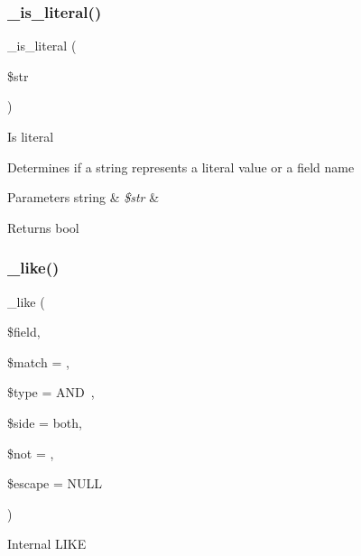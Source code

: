 \subsubsection{\texorpdfstring{\+\_\+is\+\_\+literal()}{\_is\_literal()}}
{\footnotesize\ttfamily \+\_\+is\+\_\+literal (\begin{DoxyParamCaption}\item[{}]{\$str }\end{DoxyParamCaption})\hspace{0.3cm}{\ttfamily [protected]}}

Is literal

Determines if a string represents a literal value or a field name


\begin{DoxyParams}[1]{Parameters}
string & {\em \$str} & \\
\hline
\end{DoxyParams}
\begin{DoxyReturn}{Returns}
bool 
\end{DoxyReturn}
\mbox{\label{class_c_i___d_b__query__builder_abe8f3477d4b15bf422fc52ba753056b5}} 
\subsubsection{\texorpdfstring{\+\_\+like()}{\_like()}}
{\footnotesize\ttfamily \+\_\+like (\begin{DoxyParamCaption}\item[{}]{\$field,  }\item[{}]{\$match = {\ttfamily \textquotesingle{}\textquotesingle{}},  }\item[{}]{\$type = {\ttfamily \textquotesingle{}AND~\textquotesingle{}},  }\item[{}]{\$side = {\ttfamily \textquotesingle{}both\textquotesingle{}},  }\item[{}]{\$not = {\ttfamily \textquotesingle{}\textquotesingle{}},  }\item[{}]{\$escape = {\ttfamily NULL} }\end{DoxyParamCaption})\hspace{0.3cm}{\ttfamily [protected]}}

Internal L\+I\+KE

